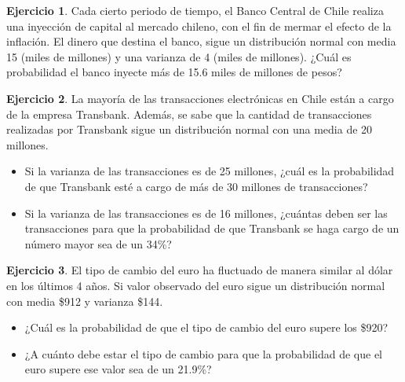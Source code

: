 \documentclass[
  11pt,
]{book}
\theoremstyle{definition}
\theoremstyle{definition}
\theoremstyle{definition}
\newtheorem{exercise}{Ejercicio}[chapter]
\theoremstyle{definition}
\theoremstyle{remark}
\begin{document}
\begin{exercise}
Cada cierto periodo de tiempo, el Banco Central de Chile realiza una inyección de capital al mercado chileno, con el fin de mermar el efecto de la inflación. El dinero que destina el banco, sigue un distribución normal con media 15 (miles de millones) y una varianza de 4 (miles de millones). ¿Cuál es probabilidad el banco inyecte más de 15.6 miles de millones de pesos?
\end{exercise}

\begin{exercise}

La mayoría de las transacciones electrónicas en Chile están a cargo de la empresa Transbank. Además, se sabe que la cantidad de transacciones realizadas por Transbank sigue un distribución normal con una media de 20 millones.

\begin{itemize}
\item
  Si la varianza de las transacciones es de 25 millones, ¿cuál es la probabilidad de que Transbank esté a cargo de más de 30 millones de transacciones?
\item
  Si la varianza de las transacciones es de 16 millones, ¿cuántas deben ser las transacciones para que la probabilidad de que Transbank se haga cargo de un número mayor sea de un 34\%?
\end{itemize}

\end{exercise}

\begin{exercise}

El tipo de cambio del euro ha fluctuado de manera similar al dólar en los últimos 4 años. Si valor observado del euro sigue un distribución normal con media \$912 y varianza \$144.

\begin{itemize}
\item
  ¿Cuál es la probabilidad de que el tipo de cambio del euro supere los \$920?
\item
  ¿A cuánto debe estar el tipo de cambio para que la probabilidad de que el euro supere ese valor sea de un 21.9\%?
\end{itemize}

\end{exercise}
\end{document}
